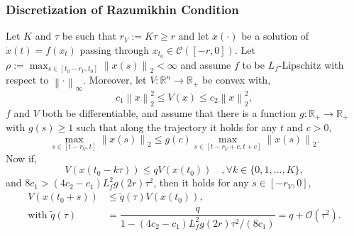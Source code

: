 \documentclass[11pt,aspectratio=169]{beamer}
\newcommand{\norm}[1]{\left\lVert#1\right\rVert}
\newcommand{\R}{\mathbb{R}}
\begin{document}

\begin{frame}[t]
    \frametitle{Discretization of Razumikhin Condition} 
Let $K$ and $\tau$ be such that $r_V:=K\tau\geq r$ and let $x(\cdot)$ be a solution of $\dot{x}(t)=f(x_t)$ passing through $x_{t_0}\in\mathcal{C}([-r,0])$. Let $\rho:=\max_{s\in[t_0-r_V,t_0]} \norm{x(s)}_2<\infty$ and assume $f$ to be $L_f$-Lipschitz with respect to $\norm{\cdot}_\infty$. Moreover, let $V:\R^n\to\R_+$ be convex with,
$$c_1 \norm{x}_2^2 \leq V(x) \leq c_2 \norm{x}_2^2,$$
$f$ and $V$ both be differentiable, and assume that there is a function $g:\R_+\to\R_+$ with $g(s)\geq 1$ such that along the trajectory it holds for any $t$ and $c>0$,
\begin{equation}
    \max_{s\in[t-r_V,t]} \norm{x(s)}_2 \leq g(c) \max_{s\in[t-r_V+c,t+c]}\norm{x(s)}_2.\label{eq:small_decay_cond}
\end{equation}
Now if,
\begin{equation}
    V(x(t_0-k\tau))\leq q V(x(t_0)) \quad,\forall k\in \lbrace 0,1,...,K \rbrace,\label{eq:DiscRazConProp}
\end{equation}
and $8c_1 > (4c_2-c_1)L_f^2 g(2r) \tau^2$, then it holds for any $s\in[-r_V,0]$,
\begin{align}
    V(x(t_0+s))&\leq \tilde{q}(\tau)V(x(t_0)),\label{eq:ContRazConProp}\\
    \text{with } \tilde{q}(\tau)&= \dfrac{q}{1-(4c_2-c_1)L_f^2g(2r)\tau^2/(8c_1)}=q+\mathcal{O}(\tau^2).\nonumber
\end{align}
\end{frame}


\end{document}
